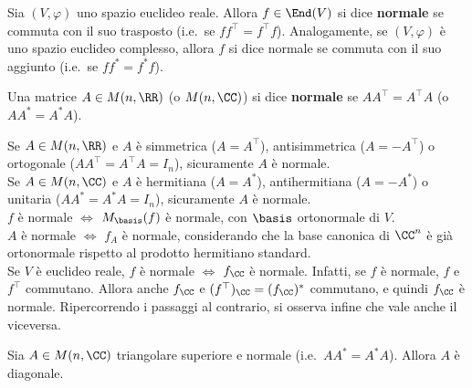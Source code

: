 \documentclass[11pt]{article}
\begin{document}
	\begin{definition} 
		Sia $(V, \varphi)$ uno spazio euclideo reale. Allora $f \in \End(V)$ si dice \textbf{normale}
		se commuta con il suo trasposto (i.e.~se $f f^\top = f^\top f$). Analogamente,
		se $(V, \varphi)$ è uno spazio euclideo complesso, allora $f$ si dice normale se commuta con il suo
		aggiunto (i.e.~se $f f^* = f^* f$).
	\end{definition}
	
	\begin{definition} 
		Una matrice $A \in M(n, \RR)$ (o $M(n, \CC)$) si dice \textbf{normale} se $A A^\top = A^\top A$ (o $A A^* = A^* A$).
	\end{definition}
	
	\begin{remark}\nl
		\li Se $A \in M(n, \RR)$ e $A$ è simmetrica ($A = A^\top$), antisimmetrica ($A = -A^\top$) o
		ortogonale ($A A^\top = A^\top A = I_n$), sicuramente $A$ è normale. \\
		\li Se $A \in M(n, \CC)$ e $A$ è hermitiana ($A = A^*$), antihermitiana ($A = -A^*$) o
		unitaria ($A A^* = A^* A = I_n$), sicuramente $A$ è normale. \\
		\li $f$ è normale $\iff$ $M_\basis(f)$ è normale, con $\basis$ ortonormale di $V$. \\
		\li $A$ è normale $\iff$ $f_A$ è normale, considerando che la base canonica di $\CC^n$ è già
		ortonormale rispetto al prodotto hermitiano standard. \\
		\li Se $V$ è euclideo reale, $f$ è normale $\iff$ $f_\CC$ è normale. Infatti, se $f$ è normale, $f$ e $f^\top$
		commutano. Allora anche $f_\CC$ e $(f^\top)_\CC = (f_\CC)^*$ commutano, e quindi $f_\CC$ è normale.
		Ripercorrendo i passaggi al contrario, si osserva infine che vale anche il viceversa.
	\end{remark}
	
	\setcounter{lemma}{0}
	
	\begin{lemma}
		Sia $A \in M(n, \CC)$ triangolare superiore e normale (i.e.~$A A^* = A^* A$). Allora
		$A$ è diagonale.
	\end{lemma}
	
\end{document}
